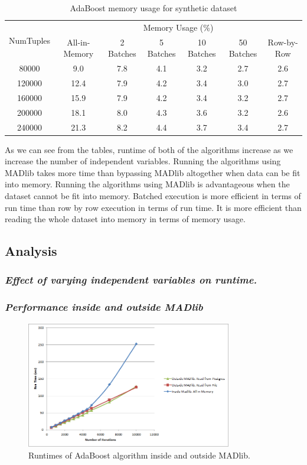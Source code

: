 \begin{table}[!htbp]
\small
\centering
\begin{tabular}{|c|c|c|c|c|c|c|}
\hline
\multirow{2}{*}{NumTuples} & \multicolumn{6}{|c|}{Memory Usage (\%)}\\
\cline{2-7}
& All-in-Memory & 2 Batches & 5 Batches & 10 Batches & 50 Batches & Row-by-Row\\
\hline
80000& 9.0&7.8&4.1 &3.2 &2.7&2.6 \\
\hline
120000& 12.4&7.9 &4.2 &3.4&3.0 &2.7 \\
\hline
160000& 15.9&7.9 &4.2 &3.4 &3.2 &2.7 \\
\hline
200000& 18.1&8.0 &4.3 &3.6 &3.2 &2.6 \\
\hline
240000& 21.3&8.2 &4.4 &3.7 &3.4 &2.7 \\
\hline
\end{tabular}
\caption{AdaBoost memory usage for synthetic dataset}
\label{tab:adaSynth2}
\end{table}

As we can see from the tables, runtime of both of the algorithms increase as we increase the number of independent variables. Running the algorithms using MADlib takes more time than bypassing MADlib altogether when data can be fit into memory. Running the algorithms using MADlib is advantageous when the dataset cannot be fit into memory. Batched execution is more efficient in terms of run time than row by row execution in terms of run time. It is more efficient than reading the whole dataset into memory in terms of memory usage.

\subsection{Analysis}
\subsubsection*{\itshape Effect of varying independent variables on runtime.}

\subsubsection*{\itshape Performance inside and outside MADlib}
\begin{figure}[ht]
\centering
\includegraphics[width=0.8\textwidth]{ada1.png}
\caption{Runtimes of AdaBoost algorithm inside and outside MADlib.}
\label{fig:adainout}
\end{figure}

